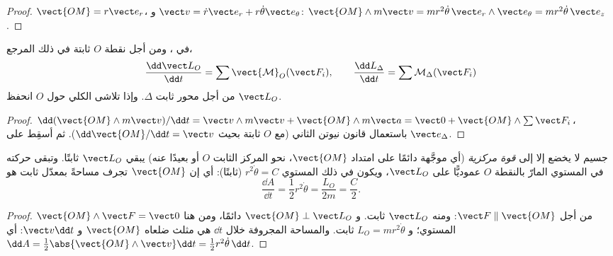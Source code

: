 \begin{proof}
$\vect{OM} = r\vect e_r$، و $\vect v = \dot r\vect e_r + r\dot\theta\vect e_\theta$:
$\vect{OM}\wedge m\vect v = mr^2\dot\theta\,\vect e_r\wedge\vect e_\theta = mr^2\dot\theta\,\vect e_z$.
\end{proof}

\begin{theorem}\label{thm:b1:angular-momentum:theorem}
في ، ومن أجل نقطة $O$ ثابتة في ذلك المرجع،
\[
\frac{\dd\vect L_O}{\dd t} = \sum\vect{\mathcal M}_O(\vect F_i),
\qquad
\frac{\dd L_\Delta}{\dd t} = \sum\mathcal M_\Delta(\vect F_i)
\]
من أجل محور ثابت $\Delta$. وإذا تلاشى  الكلي حول $O$
انحفظ $\vect L_O$.
\end{theorem}

\begin{proof}
$\dd(\vect{OM}\wedge m\vect v)/\dd t = \vect v\wedge m\vect v + \vect{OM}\wedge m\vect a
= \vect 0 + \vect{OM}\wedge\sum\vect F_i$، باستعمال قانون نيوتن الثاني
(مع $O$ ثابتة بحيث $\dd\vect{OM}/\dd t = \vect v$). ثم أسقِط على $\vect e_\Delta$.
\end{proof}

\begin{corollary}\label{cor:b1:angular-momentum:central}
جسيم لا يخضع إلا إلى \emph{قوة مركزية} (أي موجَّهة دائمًا
على امتداد $\vect{OM}$، نحو المركز الثابت $O$ أو بعيدًا عنه) يبقي
$\vect L_O$ ثابتًا. وتبقى حركته في المستوي المارّ بالنقطة $O$
عموديًّا على $\vect L_O$، ويكون في ذلك المستوي $r^2\dot\theta = C$
(ثابتًا): أي إن  $\vect{OM}$ تجرف مساحةً بمعدّل ثابت هو
\emph{}
\[
\frac{\dd A}{\dd t} = \frac12 r^2\dot\theta = \frac{L_O}{2m} = \frac{C}{2} .
\]
\end{corollary}

\begin{proof}
$\vect{OM}\wedge\vect F = \vect 0$ من أجل $\vect F \parallel \vect{OM}$: ومنه $\vect L_O$
ثابت. و $\vect{OM}\perp\vect L_O$ دائمًا، ومن هنا المستوي؛ و $L_O =
mr^2\dot\theta$ ثابت. والمساحة المجروفة خلال $\dd t$ هي
مثلث ضلعاه $\vect{OM}$ و $\vect v\dd t$: أي $\dd A = \tfrac12\abs{\vect{OM}
\wedge\vect v}\dd t = \tfrac12 r^2\dot\theta\,\dd t$.
\end{proof}

